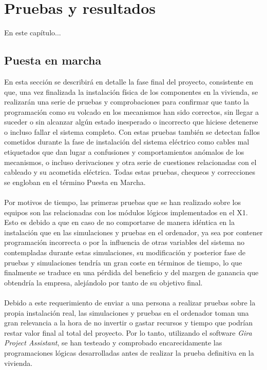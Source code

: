 \chapter{Pruebas y resultados}

En este capítulo...


\section{Puesta en marcha}
En esta sección se describirá en detalle la fase final del proyecto, consistente en que, una vez finalizada la instalación física de los componentes en la vivienda, se realizarán una serie de pruebas y comprobaciones para confirmar que tanto la programación como su volcado en los mecanismos han sido correctos, sin llegar a suceder o sin alcanzar algún estado inesperado o incorrecto que hiciese detenerse o incluso fallar el sistema completo. Con estas pruebas también se detectan fallos cometidos durante la fase de instalación del sistema eléctrico como cables mal etiquetados que dan lugar a confusiones y comportamientos anómalos de los mecanismos, o incluso derivaciones y otra serie de cuestiones relacionadas con el cableado y su acometida eléctrica. Todas estas pruebas, chequeos y correcciones se engloban en el término Puesta en Marcha.\\\\

Por motivos de tiempo, las primeras pruebas que se han realizado sobre los equipos son las relacionadas con los módulos lógicos implementados en el X1. Esto es debido a que en caso de no comportarse de manera idéntica en la instalación que en las simulaciones y pruebas en el ordenador, ya sea por contener programación incorrecta o por la influencia de otras variables del sistema no contempladas durante estas simulaciones, su modificación y posterior fase de pruebas y simulaciones tendría un gran coste en términos de tiempo, lo que finalmente se traduce en una pérdida del beneficio y del margen de ganancia que obtendría la empresa, alejándolo por tanto de su objetivo final.\\\\

Debido a este requerimiento de enviar a una persona a realizar pruebas sobre la propia instalación real, las simulaciones y pruebas en el ordenador toman una gran relevancia a la hora de no invertir o gastar recursos y tiempo que podrían restar valor final al total del proyecto. Por lo tanto, utilizando el software \textit{Gira Project Assistant}, se han testeado y comprobado encarecidamente las programaciones lógicas desarrolladas antes de realizar la prueba definitiva en la vivienda.\\\\

